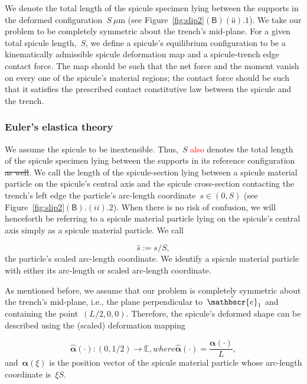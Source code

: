 \documentclass[preprint,10pt,times]{elsarticle}
\numberwithin{equation}{section}
\newcommand{\ndL}{L}
\newcommand{\physe}{\hat{\mathbscr{e}}} %
\renewcommand{\u}[1]{\boldsymbol{#1}}
\newcommand{\pr}[1]{\left( #1 \right)}
\newcommand{\subf}[1]{\pr{\textsf{#1}}}
\begin{document}
{We denote the total length of the spicule specimen
lying between the supports in the deformed configuration}~{}{$S~\mu$m}{{}
(see Figure~\ref{fig:slip2}}{$\subf{B}$$\subf{ii}.1$}{).}
We take our problem to be completely symmetric about the trench's
mid-plane. For a given total spicule length,~$S$, we define a spicule's
equilibrium configuration to be a kinematically admissible spicule
deformation map and a spicule-trench edge contact force. The map should
be such that the net force and the moment vanish on every one of the spicule's
material regions; the contact force should be such that it satisfies the
prescribed contact constitutive law between the spicule and the trench.

\subsubsection{Euler's elastica theory\label{subsec:Euler's-Elastica-theory}}

{We assume the spicule to be inextensible. Thus,~}{$S$}{{}
\textcolor{red}{also} denotes the total length of the spicule specimen lying between the
supports in its reference configuration\sout{ as well}.} We call the length
of the spicule-section lying between a spicule material particle on
the spicule's central axis and the spicule cross-section contacting
the trench's left edge the particle's arc-length coordinate~$s\in (0,S)$
({see Figure~\ref{fig:slip2}}{$\subf{B}.(ii).2$}).
When there is no risk of confusion, we will henceforth be referring
to a spicule material particle lying on the spicule's central axis
simply as a spicule material particle. We call

\begin{equation}
\label{eq:shat}
\hat{s}:=s/S,
\end{equation}the particle's scaled arc-length coordinate.{{} We
identify a} spicule material particle with either its arc-length or
scaled arc-length coordinate.

As mentioned before, we assume that our problem is completely symmetric
about the trench's mid-plane, i.e., the plane perpendicular to~$\physe_1$
and containing the point~$(\ndL/2,0,0)$. Therefore,
the spicule's deformed shape can be described using the (scaled) deformation
mapping

\begin{subequations}
\begin{equation}
\hat{\u{\alpha}}(\cdot):(0,1/2)\to\mathbb{E},
\end{equation}
where
\begin{equation}
\hat{\u{\alpha}}\pr{\cdot} =\frac{\u{\alpha}\pr{\cdot}}{\ndL} ,
\end{equation}
\label{eq:Alphahat}
\end{subequations}
and~$\u{\alpha}\pr{\xi}$ is the position vector
of the spicule material particle whose arc-length coordinate is~$\xi S$.
\end{document}
